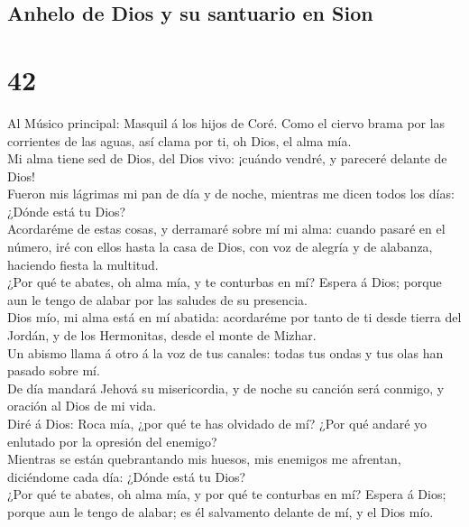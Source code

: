 \hypertarget{anhelo-de-dios-y-su-santuario-en-sion}{%
\subsection{Anhelo de Dios y su santuario en
Sion}\label{anhelo-de-dios-y-su-santuario-en-sion}}

\hypertarget{section-19-42}{%
\section{42}\label{section-19-42}}

 Al Músico principal: Masquil á los hijos de Coré. Como el
ciervo brama por las corrientes de las aguas, así clama por ti, oh Dios,
el alma mía.\\
 Mi alma tiene sed de Dios, del Dios vivo: ¡cuándo vendré,
y pareceré delante de Dios!\\
 Fueron mis lágrimas mi pan de día y de noche, mientras me
dicen todos los días: ¿Dónde está tu Dios?\\
 Acordaréme de estas cosas, y derramaré sobre mí mi alma:
cuando pasaré en el número, iré con ellos hasta la casa de Dios, con voz
de alegría y de alabanza, haciendo fiesta la multitud.\\
 ¿Por qué te abates, oh alma mía, y te conturbas en mí?
Espera á Dios; porque aun le tengo de alabar por las saludes de su
presencia.\\
 Dios mío, mi alma está en mí abatida: acordaréme por
tanto de ti desde tierra del Jordán, y de los Hermonitas, desde el monte
de Mizhar.\\
 Un abismo llama á otro á la voz de tus canales: todas tus
ondas y tus olas han pasado sobre mí.\\
 De día mandará Jehová su misericordia, y de noche su
canción será conmigo, y oración al Dios de mi vida.\\
 Diré á Dios: Roca mía, ¿por qué te has olvidado de mí?
¿Por qué andaré yo enlutado por la opresión del enemigo?\\
 Mientras se están quebrantando mis huesos, mis enemigos
me afrentan, diciéndome cada día: ¿Dónde está tu Dios?\\
 ¿Por qué te abates, oh alma mía, y por qué te conturbas
en mí? Espera á Dios; porque aun le tengo de alabar; es él salvamento
delante de mí, y el Dios mío.


